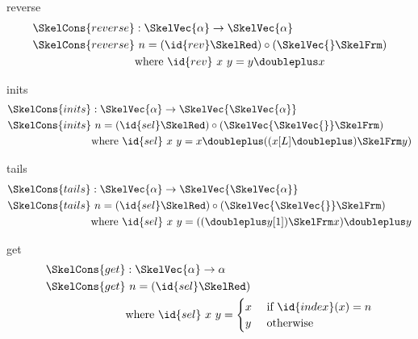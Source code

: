 \documentclass[preview]{standalone}
\begin{document}
\begin{docimage}{reverse}
  \begin{align*}
    \SkelCons{reverse} &: \SkelVec{\alpha} \rightarrow \SkelVec{\alpha} \\
    \SkelCons{reverse} &\ n = (\id{rev} \SkelRed) \circ (\SkelVec{} \SkelFrm) \\
                       & \text{where } \id{rev}\ x\ y = y \doubleplus x
  \end{align*}
\end{docimage}

\begin{docimage}{inits}
  \begin{align*}
    \SkelCons{inits} &: \SkelVec{\alpha} \rightarrow \SkelVec{\SkelVec{\alpha}} \\
    \SkelCons{inits} &\ n = (\id{sel} \SkelRed) \circ (\SkelVec{\SkelVec{}} \SkelFrm) \\
                       & \text{where } \id{sel}\ x\ y = x \doubleplus ((x[L] \doubleplus) \SkelFrm y)
  \end{align*}
\end{docimage}


\begin{docimage}{tails}
  \begin{align*}
    \SkelCons{tails} &: \SkelVec{\alpha} \rightarrow \SkelVec{\SkelVec{\alpha}} \\
    \SkelCons{tails} &\ n = (\id{sel} \SkelRed) \circ (\SkelVec{\SkelVec{}} \SkelFrm) \\
                       & \text{where } \id{sel}\ x\ y = ((\doubleplus y[1]) \SkelFrm x) \doubleplus y
  \end{align*}
\end{docimage}

\begin{docimage}{get}
  \begin{align*}
    \SkelCons{get} &: \SkelVec{\alpha} \rightarrow \alpha \\
    \SkelCons{get} &\ n = (\id{sel} \SkelRed)  \\
                   & \mbox{where }\id{sel}\ x\ y= \begin{cases}
                     x &\mbox{ if } \id{index}(x) = n \\
                     y &\mbox{ otherwise}
                   \end{cases}
  \end{align*}
\end{docimage}
\end{document}
